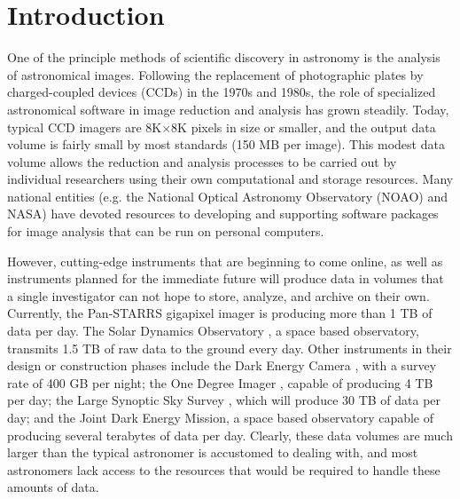 \documentclass[10pt,conference]{IEEEtran}
\begin{document}
%
\IEEEpeerreviewmaketitle

\section{Introduction}\label{sec:intro}

One of the principle methods of scientific discovery in astronomy is the analysis of astronomical images. Following the replacement of photographic plates by charged-coupled devices (CCDs) in the 1970s and 1980s, the role of specialized astronomical software in image reduction and analysis has grown steadily. Today, typical CCD imagers are 8K$\times$8K pixels in size or smaller, and the output data volume is fairly small by most standards (150 MB per image). This modest data volume allows the reduction and analysis processes to be carried out by individual researchers using their own computational and storage resources. Many national entities (e.g. the National Optical Astronomy Observatory (NOAO) and NASA) have devoted resources to developing and supporting software packages for image analysis that can be run on personal computers.  

However, cutting-edge instruments that are beginning to come online, as well as instruments planned for the immediate future will produce data in volumes that a single investigator can not hope to store, analyze, and archive on their own. Currently, the Pan-STARRS gigapixel imager \cite{tonry2002} is producing more than 1 TB of data per day. The Solar Dynamics Observatory \cite{sola2009}, a space based observatory, transmits 1.5 TB of raw data to the ground every day. Other instruments in their design or construction phases include the Dark Energy Camera \cite{flaugher2010}, with a survey rate of 400 GB per night; the One Degree Imager \cite{jacoby2002}, capable of producing 4 TB per day; the Large Synoptic Sky Survey \cite{rasmussen2010}, which will produce 30 TB of data per day; and the Joint Dark Energy Mission, a space based observatory capable of producing several terabytes of data per day. Clearly, these data volumes are much larger than the typical astronomer is accustomed to dealing with, and most astronomers lack access to the resources that would be required to handle these amounts of data.
\end{document}
